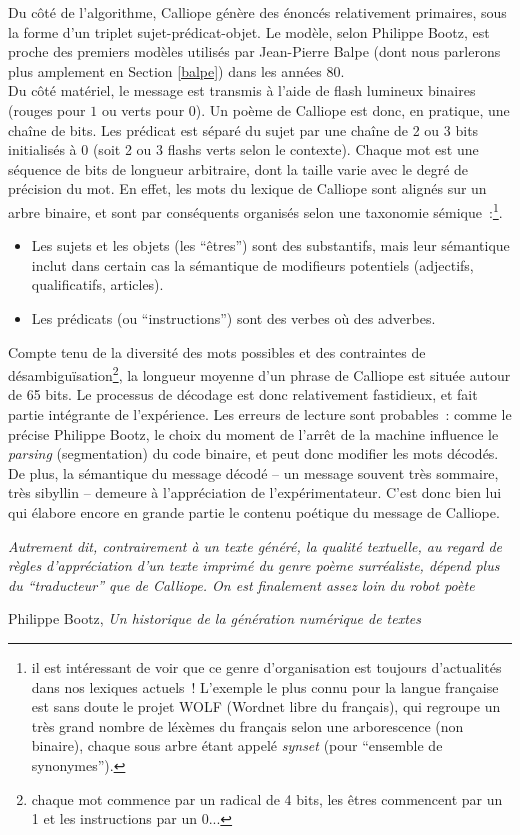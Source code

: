 \documentclass{article}
\newenvironment{citationbox}
{\begin{center}
		\begin{minipage}{.8\textwidth}
		}
		{
		\end{minipage}	
\end{center}
}
\begin{document}
				Du côté de l'algorithme, Calliope génère des énoncés relativement primaires, sous la forme d'un triplet sujet-prédicat-objet. Le modèle, selon Philippe Bootz, est proche des premiers modèles utilisés par Jean-Pierre Balpe (dont nous parlerons plus amplement en Section \ref{balpe}) dans les années 80.\\
				Du côté matériel, le message est transmis à l'aide de flash lumineux binaires (rouges pour $1$ ou verts pour $0$). Un poème de Calliope est donc, en pratique, une chaîne de bits. Les prédicat est séparé du sujet par une chaîne de 2 ou 3 bits initialisés à 0 (soit 2 ou 3 flashs verts selon le contexte). Chaque mot est une séquence de bits de longueur arbitraire, dont la taille varie avec le degré de précision du mot. En effet, les mots du lexique de Calliope sont alignés sur un arbre binaire, et sont par conséquents organisés selon une taxonomie sémique~:\footnote{il est intéressant de voir que ce genre d'organisation est toujours d'actualités dans nos lexiques actuels ! L'exemple le plus connu pour la langue française est sans doute le projet WOLF (Wordnet libre du français), qui regroupe un très grand nombre de léxèmes du français selon une arborescence (non binaire), chaque sous arbre étant appelé \textit{synset} (pour ``ensemble de synonymes'').}.
				\begin{itemize}
					\item Les sujets et les objets (les ``êtres'') sont des substantifs, mais leur sémantique inclut dans certain cas la sémantique de modifieurs potentiels (adjectifs, qualificatifs, articles).
					\item Les prédicats (ou ``instructions'') sont des verbes où des adverbes.
				\end{itemize} 
				Compte tenu de la diversité des mots possibles et des contraintes de désambiguïsation\footnote{chaque mot commence par un radical de 4 bits, les êtres commencent par un 1 et les instructions par un 0...}, la longueur moyenne d'un phrase de Calliope est située autour de 65 bits. Le processus de décodage est donc relativement fastidieux, et fait partie intégrante de l'expérience. Les erreurs de lecture sont probables~: comme le précise Philippe Bootz, le choix du moment de l'arrêt de la machine influence le \textit{parsing} (segmentation) du code binaire, et peut donc modifier les mots décodés. De plus, la sémantique du message décodé -- un message souvent très sommaire, très sibyllin -- demeure à l'appréciation de l'expérimentateur. C'est donc bien lui qui élabore encore en grande partie le contenu poétique du message de Calliope.
				\begin{citationbox}
					\textit{Autrement dit, contrairement à
					un texte généré, la qualité textuelle, au regard de règles d'appréciation d'un texte
					imprimé du genre poème surréaliste, dépend plus du ``traducteur'' que de
					Calliope. On est finalement assez loin du robot poète}
				\begin{flushright}
					Philippe Bootz, \textit{Un historique de la génération numérique de textes} \cite{bootz}
				\end{flushright}
				\end{citationbox}
			
\end{document}
